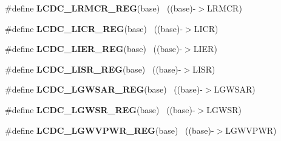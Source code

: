 \begin{DoxyCompactItemize}
\item 
\hypertarget{group___l_c_d_c___register___accessor___macros_ga95875c75a9eaf10bcef881172d18c1c0}{}\#define {\bfseries L\+C\+D\+C\+\_\+\+L\+R\+M\+C\+R\+\_\+\+R\+E\+G}(base)                                      ~((base)-\/$>$L\+R\+M\+C\+R)\label{group___l_c_d_c___register___accessor___macros_ga95875c75a9eaf10bcef881172d18c1c0}

\item 
\hypertarget{group___l_c_d_c___register___accessor___macros_gad5377b78f4ccc2448e35a36b03095ba6}{}\#define {\bfseries L\+C\+D\+C\+\_\+\+L\+I\+C\+R\+\_\+\+R\+E\+G}(base)                                        ~((base)-\/$>$L\+I\+C\+R)\label{group___l_c_d_c___register___accessor___macros_gad5377b78f4ccc2448e35a36b03095ba6}

\item 
\hypertarget{group___l_c_d_c___register___accessor___macros_ga87bf9d8061116af08455ccfdc3c76a6e}{}\#define {\bfseries L\+C\+D\+C\+\_\+\+L\+I\+E\+R\+\_\+\+R\+E\+G}(base)                                        ~((base)-\/$>$L\+I\+E\+R)\label{group___l_c_d_c___register___accessor___macros_ga87bf9d8061116af08455ccfdc3c76a6e}

\item 
\hypertarget{group___l_c_d_c___register___accessor___macros_gac11547857615adb14c31294535b59ab2}{}\#define {\bfseries L\+C\+D\+C\+\_\+\+L\+I\+S\+R\+\_\+\+R\+E\+G}(base)                                        ~((base)-\/$>$L\+I\+S\+R)\label{group___l_c_d_c___register___accessor___macros_gac11547857615adb14c31294535b59ab2}

\item 
\hypertarget{group___l_c_d_c___register___accessor___macros_ga8aed976d5ff5b0ba880a6d34147ae65d}{}\#define {\bfseries L\+C\+D\+C\+\_\+\+L\+G\+W\+S\+A\+R\+\_\+\+R\+E\+G}(base)                                    ~((base)-\/$>$L\+G\+W\+S\+A\+R)\label{group___l_c_d_c___register___accessor___macros_ga8aed976d5ff5b0ba880a6d34147ae65d}

\item 
\hypertarget{group___l_c_d_c___register___accessor___macros_gae1f58d69968cc556882d0dcc7dbd4fb1}{}\#define {\bfseries L\+C\+D\+C\+\_\+\+L\+G\+W\+S\+R\+\_\+\+R\+E\+G}(base)                                      ~((base)-\/$>$L\+G\+W\+S\+R)\label{group___l_c_d_c___register___accessor___macros_gae1f58d69968cc556882d0dcc7dbd4fb1}

\item 
\hypertarget{group___l_c_d_c___register___accessor___macros_ga7da65d4e8f1577f2b639a5329de0159f}{}\#define {\bfseries L\+C\+D\+C\+\_\+\+L\+G\+W\+V\+P\+W\+R\+\_\+\+R\+E\+G}(base)                                  ~((base)-\/$>$L\+G\+W\+V\+P\+W\+R)\label{group___l_c_d_c___register___accessor___macros_ga7da65d4e8f1577f2b639a5329de0159f}


\end{DoxyCompactItemize}
